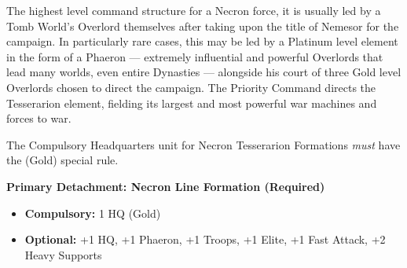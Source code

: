 The highest level command structure for a Necron force, it is usually led by a Tomb World's Overlord themselves after taking upon the title of Nemesor for the campaign. In particularly rare cases, this may be led by a Platinum level element in the form of a Phaeron — extremely influential and powerful Overlords that lead many worlds, even entire Dynasties — alongside his court of three Gold level Overlords chosen to direct the campaign. The Priority Command directs the Tesserarion element, fielding its largest and most powerful war machines and forces to war.

The Compulsory Headquarters unit for Necron Tesserarion Formations \textit{must} have the  (Gold) special rule.

\textbf{Primary Detachment: Necron Line Formation (Required)}
\begin{itemize}
	\item \textbf{Compulsory:} 1 HQ (Gold)
	\item \textbf{Optional:} +1 HQ, +1 Phaeron, +1 Troops, +1 Elite, +1 Fast Attack, +2 Heavy Supports
\end{itemize}
 
